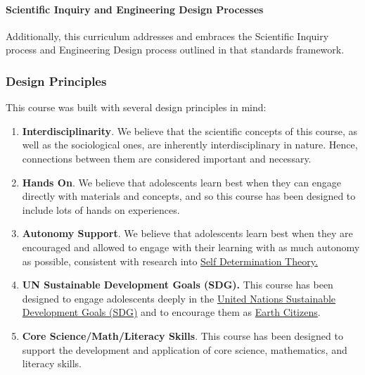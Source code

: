 \documentclass[
]{article}
\providecommand{\tightlist}{%
  \setlength{\itemsep}{0pt}\setlength{\parskip}{0pt}}
\begin{document}
\hypertarget{scientific-inquiry-and-engineering-design-processes}{%
\paragraph{Scientific Inquiry and Engineering Design
Processes}\label{scientific-inquiry-and-engineering-design-processes}}

Additionally, this curriculum addresses and embraces the Scientific
Inquiry process and Engineering Design process outlined in that
standards framework.

\hypertarget{design-principles}{%
\subsubsection{Design Principles}\label{design-principles}}

This course was built with several design principles in mind:

\begin{enumerate}
\def\labelenumi{\arabic{enumi}.}
\tightlist
\item
  \textbf{Interdisciplinarity}. We believe that the scientific concepts
  of this course, as well as the sociological ones, are inherently
  interdisciplinary in nature. Hence, connections between them are
  considered important and necessary.
\item
  \textbf{Hands On}. We believe that adolescents learn best when they
  can engage directly with materials and concepts, and so this course
  has been designed to include lots of hands on experiences.
\item
  \textbf{Autonomy Support}. We believe that adolescents learn best when
  they are encouraged and allowed to engage with their learning with as
  much autonomy as possible, consistent with research into
  \href{https://selfdeterminationtheory.org}{Self Determination Theory.}
\item
  \textbf{UN Sustainable Development Goals (SDG).} This course has been
  designed to engage adolescents deeply in the
  \href{https://www.un.org/en/sustainable-development-goals}{United
  Nations Sustainable Development Goals (SDG)} and to encourage them as
  \href{https://www.earthcitizens.org/}{Earth Citizens}.
\item
  \textbf{Core Science/Math/Literacy Skills}. This course has been
  designed to support the development and application of core science,
  mathematics, and literacy skills.
\end{enumerate}
\end{document}
